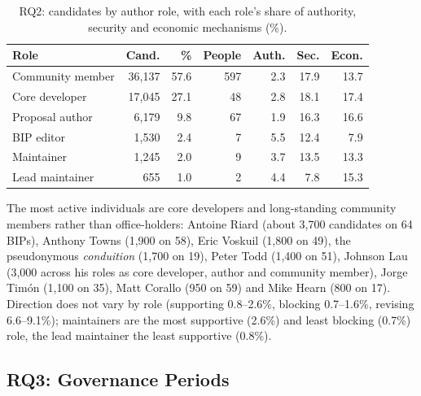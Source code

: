 \documentclass[sigconf,screen]{acmart}
\begin{document}
\begin{table}[t]
\caption{RQ2: candidates by author role, with each role's share of authority, security and economic mechanisms (\%).}
\label{tab:roles}
\small
\setlength{\tabcolsep}{4pt}
\begin{tabular}{lrrrrrr}
\toprule
Role & Cand. & \% & People & Auth. & Sec. & Econ. \\
\midrule
Community member & 36,137 & 57.6 & 597 & 2.3 & 17.9 & 13.7 \\
Core developer & 17,045 & 27.1 & 48 & 2.8 & 18.1 & 17.4 \\
Proposal author & 6,179 & 9.8 & 67 & 1.9 & 16.3 & 16.6 \\
BIP editor & 1,530 & 2.4 & 7 & 5.5 & 12.4 & 7.9 \\
Maintainer & 1,245 & 2.0 & 9 & 3.7 & 13.5 & 13.3 \\
Lead maintainer & 655 & 1.0 & 2 & 4.4 & 7.8 & 15.3 \\
\bottomrule
\end{tabular}
\end{table}

The most active individuals are core developers and long-standing community members rather than office-holders: Antoine Riard (about 3,700 candidates on 64 BIPs), Anthony Towns (1,900 on 58), Eric Voskuil (1,800 on 49), the pseudonymous \emph{conduition} (1,700 on 19), Peter Todd (1,400 on 51), Johnson Lau (3,000 across his roles as core developer, author and community member), Jorge Tim\'on (1,100 on 35), Matt Corallo (950 on 59) and Mike Hearn (800 on 17). Direction does not vary by role (supporting 0.8--2.6\%, blocking 0.7--1.6\%, revising 6.6--9.1\%); maintainers are the most supportive (2.6\%) and least blocking (0.7\%) role, the lead maintainer the least supportive (0.8\%).

\subsection{RQ3: Governance Periods}
\end{document}
